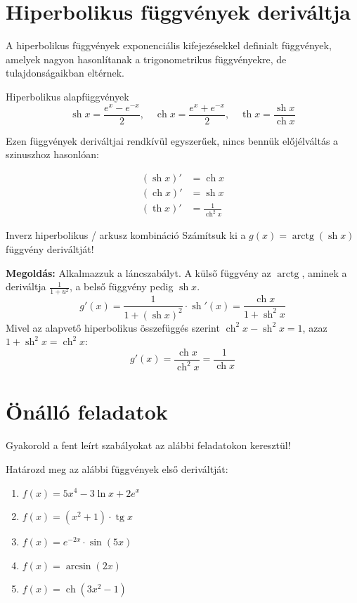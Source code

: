 \documentclass[11pt,a4paper]{article}
\begin{document}
\section{Hiperbolikus függvények deriváltja}
A hiperbolikus függvények exponenciális kifejezésekkel definialt függvények, amelyek nagyon hasonlítanak a trigonometrikus függvényekre, de tulajdonságaikban eltérnek.

\begin{defbox}{Hiperbolikus alapfüggvények}
\[
\operatorname{sh} x = \frac{e^x - e^{-x}}{2}, \quad \operatorname{ch} x = \frac{e^x + e^{-x}}{2}, \quad \operatorname{th} x = \frac{\operatorname{sh} x}{\operatorname{ch} x}
\]
\end{defbox}

Ezen függvények deriváltjai rendkívül egyszerűek, nincs bennük előjélváltás a szinuszhoz hasonlóan:

\begin{align*}
    (\operatorname{sh} x)' &= \operatorname{ch} x \\
    (\operatorname{ch} x)' &= \operatorname{sh} x \\
    (\operatorname{th} x)' &= \frac{1}{\operatorname{ch}^2 x}
\end{align*}

\begin{examplebox}{Inverz hiperbolikus / arkusz kombináció}
Számítsuk ki a $g(x) = \operatorname{arctg}(\operatorname{sh} x)$ függvény deriváltját!
\vspace{0.2cm}

\textbf{Megoldás:}
Alkalmazzuk a láncszabályt. A külső függvény az $\operatorname{arctg}$, aminek a deriváltja $\frac{1}{1 + u^2}$, a belső függvény pedig $\operatorname{sh} x$.
\[
g'(x) = \frac{1}{1 + (\operatorname{sh} x)^2} \cdot \operatorname{sh}'(x) = \frac{\operatorname{ch} x}{1 + \operatorname{sh}^2 x}
\]
Mivel az alapvető hiperbolikus összefüggés szerint $\operatorname{ch}^2 x - \operatorname{sh}^2 x = 1$, azaz $1 + \operatorname{sh}^2 x = \operatorname{ch}^2 x$:
\[
g'(x) = \frac{\operatorname{ch} x}{\operatorname{ch}^2 x} = \frac{1}{\operatorname{ch} x}
\]
\end{examplebox}

\section{Önálló feladatok}
Gyakorold a fent leírt szabályokat az alábbi feladatokon keresztül!

\begin{exercisebox}
Határozd meg az alábbi függvények első deriváltját:
\begin{enumerate}
    \item $f(x) = 5x^4 - 3\ln x + 2e^x$
    \item $f(x) = (x^2 + 1) \cdot \operatorname{tg} x$
    \item $f(x) = e^{-2x} \cdot \sin(5x)$
    \item $f(x) = \arcsin(2x)$
    \item $f(x) = \operatorname{ch}(3x^2 - 1)$
\end{enumerate}
\end{exercisebox}
\end{document}
